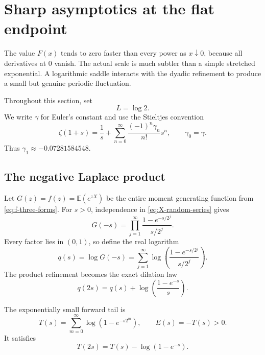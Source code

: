 \documentclass[11pt,oneside]{article}
\theoremstyle{definition}
\theoremstyle{remark}
\newcommand{\E}{\mathbb E}
\newcommand{\Ltwo}{L}
\begin{document}
\section{Sharp asymptotics at the flat endpoint}\label{sec:asymptotic}

The value $F(x)$ tends to zero faster than every power as $x\downarrow0$, because
all derivatives at $0$ vanish.  The actual scale is much subtler than a simple
stretched exponential.  A logarithmic saddle interacts with the dyadic refinement
to produce a small but genuine periodic fluctuation.

Throughout this section, set
\begin{equation}\label{eq:L-def}
  \Ltwo=\log2.
\end{equation}
We write $\gamma$ for Euler's constant and use the Stieltjes convention
\begin{equation}\label{eq:Stieltjes-convention}
  \zeta(1+s)=\frac1s+\sum_{n=0}^{\infty}
  \frac{(-1)^n\gamma_n}{n!}s^n,
  \qquad \gamma_0=\gamma.
\end{equation}
Thus $\gamma_1\approx-0.07281584548$.

\subsection{The negative Laplace product}

Let $G(z)=f(z)=\E(e^{zX})$ be the entire moment generating function from
\eqref{eq:f-three-forms}.  For $s>0$, independence in
\eqref{eq:X-random-series} gives
\begin{equation}\label{eq:negative-Laplace-product}
  G(-s)=\prod_{j=1}^{\infty}
  \frac{1-e^{-s/2^j}}{s/2^j}.
\end{equation}
Every factor lies in $(0,1)$, so define the real logarithm
\begin{equation}\label{eq:q-def}
  q(s)=\log G(-s)
  =\sum_{j=1}^{\infty}
  \log\left(\frac{1-e^{-s/2^j}}{s/2^j}\right).
\end{equation}
The product refinement becomes the exact dilation law
\begin{equation}\label{eq:q-dilation}
  q(2s)=q(s)+\log\left(\frac{1-e^{-s}}s\right).
\end{equation}

The exponentially small forward tail is
\begin{equation}\label{eq:T-E-def}
  T(s)=\sum_{m=0}^{\infty}\log(1-e^{-s2^m}),
  \qquad E(s)=-T(s)>0.
\end{equation}
It satisfies
\begin{equation}\label{eq:tail-shift}
  T(2s)=T(s)-\log(1-e^{-s}).
\end{equation}
\end{document}
